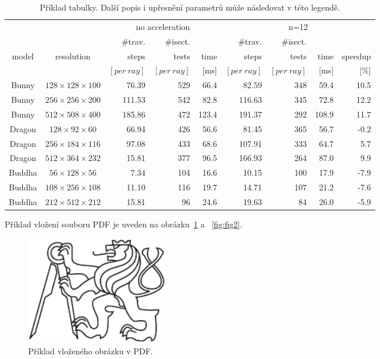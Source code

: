 \documentclass[report,11pt]{elsarticle}
\begin{document}
\begin{table}[t]\footnotesize
\begin{center}
\begin{tabular}{| c | c || r | r | r || r | r | r | r |}
\hline
          &               &   \multicolumn{3}{c||}{no acceleration}     &   \multicolumn{4}{c|}{n=12}  \\
\cline{3-9}
          &                 & \#trav. & \#isect. &      & \#trav. & \#isect. &  & \\
model & resolution &  steps    &    tests   & time  & steps    &    tests   & time   &  speedup \\
          &                  & $[per~ray]$ &  $ [per~ray]$   & [ms]  &$ [per~ray]$    &   $[per~ray]$   & [ms]  & [\%]  \\
\hline
\hline
Bunny & $128\times128\times100$ & 76.39 & 529 & 66.4 & 82.59 &  348 & 59.4 & 10.5 \\ \hline
Bunny & $256\times256\times200$ & 111.53 & 542 & 82.8 & 116.63 &  345 & 72.8 & 12.2 \\ \hline
Bunny & $512\times508\times400$ & 185.86 & 472 & 123.4 & 191.37 &  292 & 108.9 & 11.7 \\ \hline
Dragon & $128\times92\times60$ & 66.94 & 426 & 56.6 & 81.45 &  365 & 56.7 & -0.2 \\ \hline
Dragon & $256\times184\times116$ & 97.08 & 433 & 68.6 & 107.91 &  333 & 64.7 & 5.7 \\ \hline
Dragon &  $512\times364\times232$ & 15.81 & 377 & 96.5 & 166.93 &  264 & 87.0 & 9.9 \\ \hline
Buddha & $56\times128\times56$ & 7.34 & 104 & 16.6 & 10.15 &  100 & 17.9 & -7.9 \\ \hline
Buddha & $108\times256\times108$ & 11.10 & 116 & 19.7 & 14.71 &  107 & 21.2 & -7.6 \\ \hline
Buddha & $212\times512\times212$ & 15.81 & 96 & 24.6 & 19.63 &  84 & 26.0 & -5.9 \\ \hline
\end{tabular}
\end{center}
\vspace*{0mm}
\caption{{\label{tab:tab1}}Příklad tabulky. Další popis i upřesnění
  parametrů může následovat v této legendě.}
\vspace*{0mm}
\label{shadowtable}
\end{table}

Příklad vložení souboru PDF je uveden na obrázku~\ref{fig:fig1} a ~\ref{fig:fig2}.

\begin{figure}[!ht]
\begin{center}
  \includegraphics[width=0.3\textwidth]{cvut-logo-bw}
\caption{{\label{fig:fig1}}Příklad vloženého obrázku v PDF.}
\end{center}
\end{figure}
\end{document}
